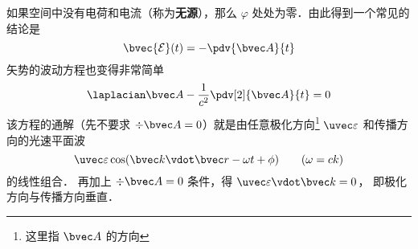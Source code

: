 如果空间中没有电荷和电流（称为\textbf{无源}），那么 $\varphi$ 处处为零．由此得到一个常见的结论是
\begin{equation}\label{Cgauge_eq2}
\bvec {\mathcal{E}}(t) = -\pdv{\bvec A}{t}
\end{equation}
矢势的波动方程也变得非常简单
\begin{equation}
\laplacian \bvec A - \frac{1}{c^2} \pdv[2]{\bvec A}{t} = 0
\end{equation}
该方程的通解（先不要求 $\div \bvec A = 0$）就是由任意极化方向\footnote{这里指 $\bvec A$ 的方向} $\uvec \varepsilon$ 和传播方向的光速平面波
\begin{equation}
\uvec \varepsilon \cos(\bvec k \vdot \bvec r - \omega t + \phi) \qquad (\omega = ck)
\end{equation}
的线性组合． 再加上 $\div \bvec A = 0$ 条件，得 $\uvec \varepsilon \vdot \bvec k = 0$， 即极化方向与传播方向垂直．
